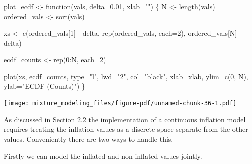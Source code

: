 \documentclass[
  letterpaper,
  DIV=11,
  numbers=noendperiod]{scrartcl}
\newenvironment{Shaded}{\begin{snugshade}}{\end{snugshade}}
\newcommand{\AttributeTok}[1]{\textcolor[rgb]{0.40,0.45,0.13}{#1}}
\newcommand{\ControlFlowTok}[1]{\textcolor[rgb]{0.00,0.23,0.31}{#1}}
\newcommand{\DecValTok}[1]{\textcolor[rgb]{0.68,0.00,0.00}{#1}}
\newcommand{\FloatTok}[1]{\textcolor[rgb]{0.68,0.00,0.00}{#1}}
\newcommand{\FunctionTok}[1]{\textcolor[rgb]{0.28,0.35,0.67}{#1}}
\newcommand{\NormalTok}[1]{\textcolor[rgb]{0.00,0.23,0.31}{#1}}
\newcommand{\OtherTok}[1]{\textcolor[rgb]{0.00,0.23,0.31}{#1}}
\newcommand{\SpecialCharTok}[1]{\textcolor[rgb]{0.37,0.37,0.37}{#1}}
\newcommand{\StringTok}[1]{\textcolor[rgb]{0.13,0.47,0.30}{#1}}
\begin{document}
\begin{Shaded}
\begin{Highlighting}[]
\NormalTok{plot\_ecdf }\OtherTok{\textless{}{-}} \ControlFlowTok{function}\NormalTok{(vals, }\AttributeTok{delta=}\FloatTok{0.01}\NormalTok{, }\AttributeTok{xlab=}\StringTok{""}\NormalTok{) \{}
\NormalTok{  N }\OtherTok{\textless{}{-}} \FunctionTok{length}\NormalTok{(vals)}
\NormalTok{  ordered\_vals }\OtherTok{\textless{}{-}} \FunctionTok{sort}\NormalTok{(vals)}

\NormalTok{  xs }\OtherTok{\textless{}{-}} \FunctionTok{c}\NormalTok{(ordered\_vals[}\DecValTok{1}\NormalTok{] }\SpecialCharTok{{-}}\NormalTok{ delta,}
          \FunctionTok{rep}\NormalTok{(ordered\_vals, }\AttributeTok{each=}\DecValTok{2}\NormalTok{),}
\NormalTok{          ordered\_vals[N] }\SpecialCharTok{+}\NormalTok{ delta)}

\NormalTok{  ecdf\_counts }\OtherTok{\textless{}{-}} \FunctionTok{rep}\NormalTok{(}\DecValTok{0}\SpecialCharTok{:}\NormalTok{N, }\AttributeTok{each=}\DecValTok{2}\NormalTok{)}

  \FunctionTok{plot}\NormalTok{(xs, ecdf\_counts, }\AttributeTok{type=}\StringTok{"l"}\NormalTok{, }\AttributeTok{lwd=}\StringTok{"2"}\NormalTok{, }\AttributeTok{col=}\StringTok{"black"}\NormalTok{,}
       \AttributeTok{xlab=}\NormalTok{xlab,}
       \AttributeTok{ylim=}\FunctionTok{c}\NormalTok{(}\DecValTok{0}\NormalTok{, N), }\AttributeTok{ylab=}\StringTok{"ECDF (Counts)"}\NormalTok{)}
\NormalTok{\}}
\end{Highlighting}
\end{Shaded}

\begin{Shaded}
\end{Shaded}

\texttt{[image: mixture\_modeling\_files/figure-pdf/unnamed-chunk-36-1.pdf]}

As discussed in \hyperref[sec:cont_infl]{Section 2.2} the implementation
of a continuous inflation model requires treating the inflation values
as a discrete space separate from the other values. Conveniently there
are two ways to handle this.

Firstly we can model the inflated and non-inflated values jointly.
\end{document}
